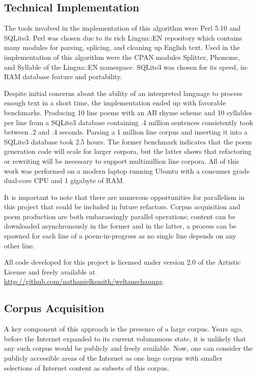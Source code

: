 \documentclass[10pt]{article}
\begin{document}
\subsection{Technical Implementation}
The tools involved in the implementation of this algorithm were Perl
5.10\cite{perl} and SQLite3\cite{sqlite3}. Perl was chosen due to its rich
Lingua::EN repository which contains many modules for parsing, splicing, and
cleaning up English text. Used in the implementation of this algorithm were the
CPAN modules Splitter\cite{splitter}, Phoneme\cite{phoneme}, and
Syllable\cite{syllable} of the Lingua::EN namespace. SQLite3 was chosen for its
speed, in-RAM database feature and portability.

Despite initial concerns about the ability of an interpreted language to
process enough text in a short time, the implementation ended up with favorable
benchmarks. Producing 10 line poems with an AB rhyme scheme and 10 syllables
per line from a SQLite3 database containing .4 million sentences consistently
took between .2 and .4 seconds. Parsing a 1 million line corpus and inserting
it into a SQLite3 database took 2.5 hours. The former benchmark indicates that
the poem generation code will scale for larger corpora, but the latter shows
that refactoring or rewriting will be necessary to support multimillion line
corpora. All of this work was performed on a modern laptop running Ubuntu with
a consumer grade dual-core CPU and 1 gigabyte of RAM.

It is important to note that there are numerous opportunities for parallelism
in this project that could be included in future refactors. Corpus acquisition
and poem production are both embarassingly parallel operations; content can be
downloaded asynchronously in the former and in the latter, a process can be
spawned for each line of a poem-in-progress as no single line depends on any
other line.

All code developed for this project is licensed under version 2.0 of the
Artistic License and freely available at
\url{http://github.com/nathanielksmith/weltanschauung}.

\subsection{Corpus Acquisition}
A key component of this approach is the presence of a large corpus. Years ago,
before the Internet expanded to its current volumnuous state, it is unlikely
that any such corpus would be publicly and freely available. Now, one can
consider the publicly accessible areas of the Internet as one huge corpus with
smaller selections of Internet content as subsets of this corpus.
\end{document}
